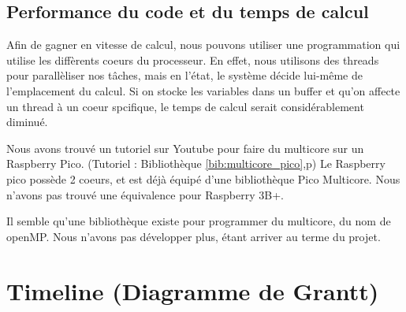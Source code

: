 \documentclass[a4paper]{report}
\begin{document}
            \subsection{Performance du code et du temps de calcul}
            
            Afin de gagner en vitesse de calcul, nous pouvons utiliser une programmation qui utilise
    les diffèrents coeurs du processeur. En effet, nous utilisons des threads pour parallèliser
    nos t\^{a}ches, mais en l'état, le système décide lui-m\^{e}me de l'emplacement du calcul.
    Si on stocke les variables dans un buffer et qu'on affecte un thread à un coeur spcifique, 
    le temps de calcul serait considérablement diminué. 
    
    Nous avons trouvé un tutoriel sur Youtube pour faire du multicore sur un Raspberry Pico.
    (Tutoriel : Bibliothèque \ref{bib:multicore_pico},p\pageref{bib:multicore_pico})
    Le Raspberry pico possède 2 coeurs, et est déjà équipé d'une bibliothèque Pico Multicore.
    Nous n'avons pas trouvé une équivalence pour Raspberry 3B+. 

    Il semble qu'une bibliothèque existe pour programmer du multicore, du nom de openMP. 
    Nous n'avons pas développer plus, étant arriver au terme du projet.
    
        \section{Timeline (Diagramme de Grantt)}
    
    
    
\end{document}
